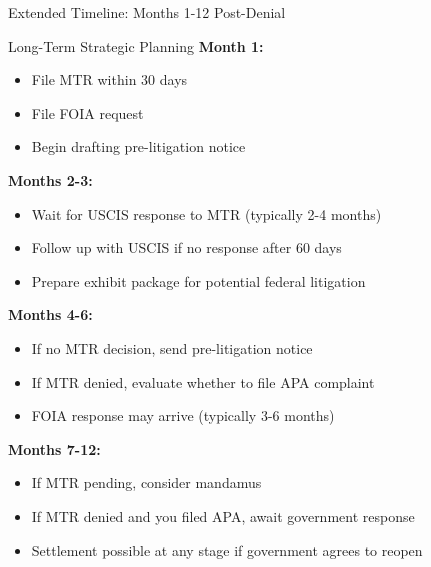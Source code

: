 \documentclass[11pt]{beamer}
\begin{document}
	\begin{frame}{Extended Timeline: Months 1-12 Post-Denial}
		\scriptsize
		\begin{block}{Long-Term Strategic Planning}
			\textbf{Month 1:}
			\begin{itemize}
				\item File MTR within 30 days
				\item File FOIA request
				\item Begin drafting pre-litigation notice
			\end{itemize}
			\textbf{Months 2-3:}
			\begin{itemize}
				\item Wait for USCIS response to MTR (typically 2-4 months)
				\item Follow up with USCIS if no response after 60 days
				\item Prepare exhibit package for potential federal litigation
			\end{itemize}
			\textbf{Months 4-6:}
			\begin{itemize}
				\item If no MTR decision, send pre-litigation notice
				\item If MTR denied, evaluate whether to file APA complaint
				\item FOIA response may arrive (typically 3-6 months)
			\end{itemize}
			\textbf{Months 7-12:}
			\begin{itemize}
				\item If MTR pending, consider mandamus
				\item If MTR denied and you filed APA, await government response
				\item Settlement possible at any stage if government agrees to reopen
			\end{itemize}
		\end{block}
	\end{frame}
	
	
\end{document}
